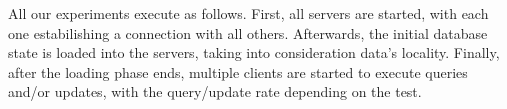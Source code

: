 \documentclass[sigplan,10pt]{acmart}
\newcommand{\andre}[1]{\nbnote{Andre}{blue}{#1}}
\begin{document}

All our experiments execute as follows.
First, all servers are started, with each one estabilishing a connection with all others.
Afterwards, the initial database state is loaded into the servers, taking into consideration data’s locality.
Finally, after the loading phase ends, 
multiple clients are started to execute queries and/or updates, with the query/update rate depending on the test.
\end{document}
